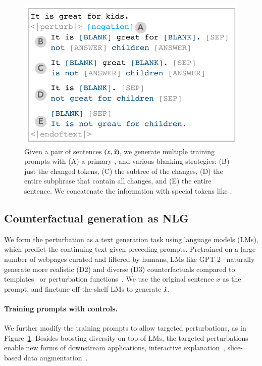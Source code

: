 \begin{figure}[t]
\centering
\includegraphics[width=1\columnwidth]{figures/blank}
\vspace{-15pt}
\caption{Given a pair of sentences $(x, \hat{x})$, we generate multiple training prompts with (A) a primary \tagstr, and various blanking strategies: (B) just the changed tokens, (C) the subtree of the changes, (D) the entire subphrase that contain all changes, and (E) the entire sentence.
We concatenate the information with special tokens like \perturbtoken.
}
\vspace{-10pt}
\label{fig:blank}
\end{figure}

\subsection{Counterfactual generation as NLG}

We form the perturbation as a text generation task using language models (LMs), which predict the continuing text given preceding prompts.
Pretrained on a large number of webpages curated and filtered by humans, LMs like GPT-2~\cite{radford2019language} naturally generate more realistic (D2) and diverse (D3) counterfactuals compared to templates~\cite{ribeiro2018sear} or perturbation functions~\cite{wu2019errudite}.
We use the original sentence $x$ as the prompt, and finetune off-the-shelf LMs to generate $\hat{x}$.

\paragraph{Training prompts with controls.}
We further modify the training prompts to allow targeted perturbations, as in Figure~\ref{fig:blank}.
Besides boosting diversity on top of LMs, the targeted perturbations enable new forms of downstream applications, \eg interactive explanation~\cite{miller}, slice-based data augmentation~\cite{chen2019slice}.

